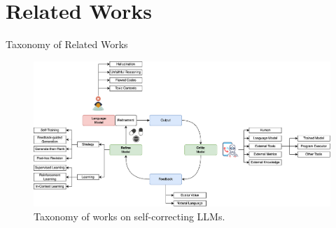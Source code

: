 \section{Related Works}

\begin{frame}{Taxonomy of Related Works}
    \begin{figure}
        \centering
        \includegraphics[width=1\textwidth]{img/taxonomy}
        \captionsetup{font=small,labelformat=empty}
        \caption{Taxonomy of works on self-correcting LLMs.}\label{fig:taxonomy}
    \end{figure}
\end{frame}

